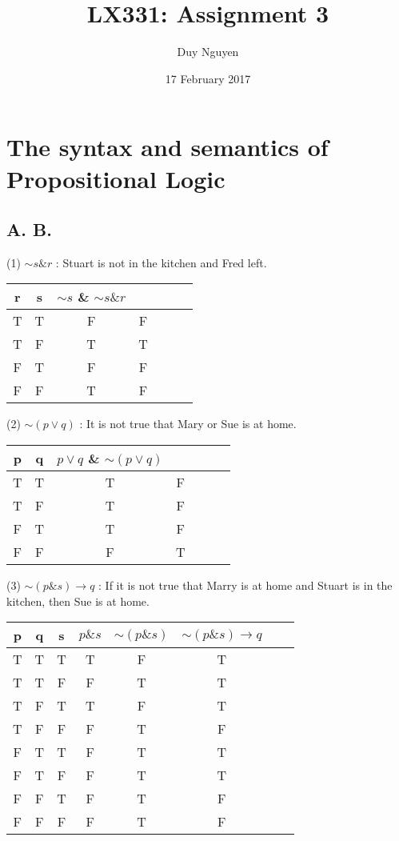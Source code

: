 \documentclass{article}
\title{LX331: Assignment 3}
\author{Duy Nguyen}
\date{17 February 2017}
\begin{document}
\maketitle

\section{The syntax and semantics of Propositional Logic}
\subsection*{A. B.}
(1) $\sim s \& r$ : Stuart is not in the kitchen and Fred left.

\begin{tabular}{cc|ccccc}
r & s & $\sim s$ \& $\sim s \& r$ \\
\hline 
T & T & F & F \\
T & F & T & T \\
F & T & F & F \\
F & F & T & F \\
\end{tabular}

(2) $\sim (p \lor q)$ : It is not true that Mary or Sue is at home.

\begin{tabular}{cc|ccccc}
p & q & $p \lor q$ \& $\sim (p \lor q)$ \\
\hline 
T & T & T & F \\
T & F & T & F \\
F & T & T & F \\
F & F & F & T \\
\end{tabular}

(3) $\sim (p \& s) \rightarrow q$ : If it is not true that Marry is at home and Stuart is in the kitchen, then Sue is at home.

\begin{tabular}{ccc|ccccc}
p & q & s & $p \& s$ & $\sim (p \& s)$ & $\sim (p \& s) \rightarrow q$ \\
\hline 
T &T & T & T & F & T \\
T &T & F & F & T & T\\
T &F & T & T & F & T\\
T &F & F & F & T & F\\
F &T & T & F & T & T\\
F &T & F & F & T & T\\
F &F & T & F & T & F\\
F &F & F & F & T & F\\
\end{tabular}
\end{document}
